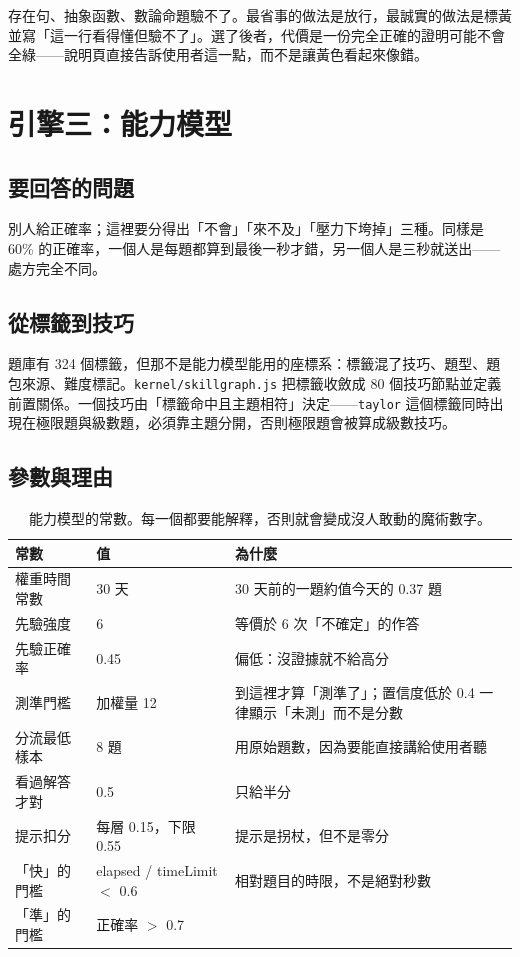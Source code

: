 \documentclass[11pt,a4paper,oneside]{report}
\renewcommand{\_}{\ifmmode\origunderscore\else\textunderscore\allowbreak\fi}
\newcommand{\code}[1]{\texttt{#1}}
\newcommand{\file}[1]{\texttt{\small #1}}
\begin{document}
\begin{decision}[標黃而不是標綠]
存在句、抽象函數、數論命題驗不了。最省事的做法是放行，最誠實的做法是標黃並寫「這一行看得懂但驗不了」。選了後者，代價是一份完全正確的證明可能不會全綠——說明頁直接告訴使用者這一點，而不是讓黃色看起來像錯。
\end{decision}

\chapter{引擎三：能力模型}
\section{要回答的問題}
別人給正確率；這裡要分得出「不會」「來不及」「壓力下垮掉」三種。同樣是 60\% 的正確率，一個人是每題都算到最後一秒才錯，另一個人是三秒就送出——處方完全不同。

\section{從標籤到技巧}
題庫有 324 個標籤，但那不是能力模型能用的座標系：標籤混了技巧、題型、題包來源、難度標記。\file{kernel/skill\_graph.js} 把標籤收斂成 80 個技巧節點並定義前置關係。一個技巧由「標籤命中且主題相符」決定——\code{taylor} 這個標籤同時出現在極限題與級數題，必須靠主題分開，否則極限題會被算成級數技巧。

\section{參數與理由}
\begin{table}[h]
\centering\small\sffamily
\begin{tabularx}{\textwidth}{@{}llY@{}}
\toprule
常數 & 值 & 為什麼 \\
\midrule
權重時間常數 & 30 天 & 30 天前的一題約值今天的 0.37 題 \\
先驗強度 & 6 & 等價於 6 次「不確定」的作答 \\
先驗正確率 & 0.45 & 偏低：沒證據就不給高分 \\
測準門檻 & 加權量 12 & 到這裡才算「測準了」；置信度低於 0.4 一律顯示「未測」而不是分數 \\
分流最低樣本 & 8 題 & 用原始題數，因為要能直接講給使用者聽 \\
看過解答才對 & 0.5 & 只給半分 \\
提示扣分 & 每層 0.15，下限 0.55 & 提示是拐杖，但不是零分 \\
「快」的門檻 & elapsed / timeLimit $<$ 0.6 & 相對題目的時限，不是絕對秒數 \\
「準」的門檻 & 正確率 $>$ 0.7 & \\
\bottomrule
\end{tabularx}
\caption{能力模型的常數。每一個都要能解釋，否則就會變成沒人敢動的魔術數字。}
\end{table}
\end{document}
